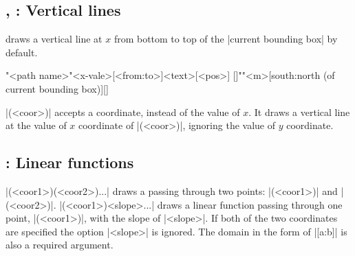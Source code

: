 \subsection{\protect\cmd{\tzvfnat}, \protect\cmd{\tzvfn}: Vertical lines}
\label{ssi:tzvfn}

\icmd{\tzvfnat} draws a vertical line at $x$ from bottom to top of the |current bounding box| by default.

\begin{tzdef}{}
\tzvfnat[<opt>]"<path name>"{<x-vale>}[<from:to>]{<text>}[<pos>]
  []""{<m>}[south:north (of current bounding box)]{}[]
\end{tzdef}

\icmd{\tzvfn}|(<coor>)| accepts a coordinate, instead of the value of $x$. It draws a vertical line at the value of $x$ coordinate of |(<coor>)|, ignoring the value of $y$ coordinate.

\begin{tzcode}{.3}
\end{tzcode}



\subsection{\protect\cmd{\tzLFn}: Linear functions}
\label{ssi:tzLFn}

\icmd{\tzLFn}|(<coor1>)(<coor2>)...| draws a  passing through two points: |(<coor1>)| and |(<coor2>)|.
|\tzLFn(<coor1>){<slope>}...| draws a linear function passing through one point, |(<coor1>)|,  with the slope of |<slope>|. If both of the two coordinates are specified the option |{<slope>}| is ignored. The domain in the form of |[a:b]| is also a required argument.

\begin{tzcode}{.3}
\end{tzcode}



